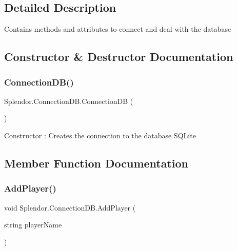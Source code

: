 \subsection{Detailed Description}
Contains methods and attributes to connect and deal with the database 



\subsection{Constructor \& Destructor Documentation}
\mbox{\label{class_splendor_1_1_connection_d_b_aaaa5c66d4f12702d36a76dd21beb62c4}} 
\subsubsection{\texorpdfstring{Connection\+D\+B()}{ConnectionDB()}}
{\footnotesize\ttfamily Splendor.\+Connection\+D\+B.\+Connection\+DB (\begin{DoxyParamCaption}{ }\end{DoxyParamCaption})}



Constructor \+: Creates the connection to the database S\+Q\+Lite 



\subsection{Member Function Documentation}
\mbox{\label{class_splendor_1_1_connection_d_b_a122fc944f46910732f429432c0f80ec3}} 
\subsubsection{\texorpdfstring{Add\+Player()}{AddPlayer()}}
{\footnotesize\ttfamily void Splendor.\+Connection\+D\+B.\+Add\+Player (\begin{DoxyParamCaption}\item[{string}]{player\+Name }\end{DoxyParamCaption})}



